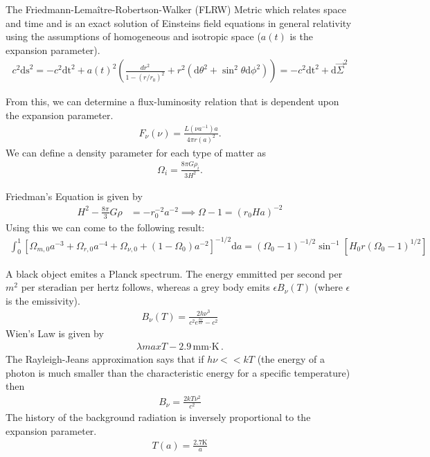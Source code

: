 The Friedmann-Lema\^{i}tre-Robertson-Walker (FLRW) Metric which relates space and time and is an exact solution of Einsteins field equations in general relativity using the assumptions of homogeneous and isotropic space ($a(t)$ is the expansion parameter).
\begin{align}
	c^2 \textrm{ds}^2=-c^2\textrm{dt}^2+a(t)^2\left(\frac{dr^2}{1-(r/r_0)^2}+r^2(\textrm{d}\theta^2+\sin^2\theta \textrm{d}\phi^2) \right) = -c^2\textrm{dt}^2+\textrm{d}\vec{\Sigma}^2
\end{align}
\begin{multicols}{2}
From this, we can determine a flux-luminosity relation that is dependent upon the expansion parameter.
\begin{align}
	F_\nu(\nu)=\frac{L(\nu a^{-1})a}{4\pi r(a)^2}.
\end{align}
We can define a density parameter for each type of matter as
\begin{align}
	\Omega_i = \frac{8\pi G \rho_i}{3H^2}.
\end{align}
\end{multicols}
Friedman's Equation is given by
\begin{align}
	H^2-\frac{8\pi}{3}G\rho &=-r_0^{-2}a^{-2} \implies
	\Omega-1 =(r_0Ha)^{-2}
\end{align}
Using this we can come to the following result:
\begin{align}
	\int_0^1[\Omega_{m,0}a^{-3}+\Omega_{r,0}a^{-4}+\Omega_{\nu,0}+(1-\Omega_0)a^{-2}]^{-1/2}\textrm{d}a = (\Omega_0-1)^{-1/2}\sin^{-1}[H_0r(\Omega_0-1)^{1/2}]
\end{align}
\begin{multicols}{2}
A black object emites a Planck spectrum. The energy emmitted per second per $m^2$ per steradian per hertz follows, whereas a grey body emits $\epsilon B_\nu(T)$ (where $\epsilon$ is the emissivity).
\begin{align}
	B_\nu (T) = \frac{2h\nu^3}{c^2e^{\frac{h\nu}{kT}}-c^2}
\end{align}
Wien's Law is given by 
\begin{align}
	\lambda{max} T - 2.9 \textrm{mm$\cdot$K}.
\end{align}
The Rayleigh-Jeans approximation says that if $h\nu <<kT$ (the energy of a photon is much smaller than the characteristic energy for a specific temperature) then
\begin{align}
	B_\nu = \frac{2kT\nu^2}{c^2}
\end{align}
The history of the background radiation is inversely proportional to the expansion parameter.
\begin{align}
	T(a) = \frac{2.7 \textrm{K}}{a}
\end{align}
\end{multicols}



